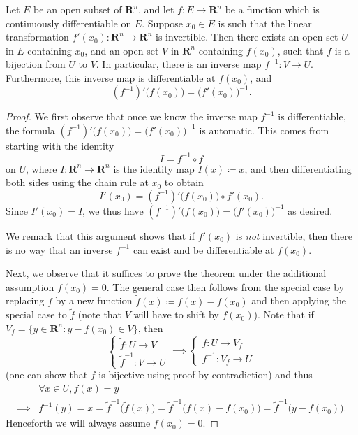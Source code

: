 \begin{theorem}\label{6.7.2}
    Let \(E\) be an open subset of \(\mathbf{R}^n\), and let \(f : E \to \mathbf{R}^n\) be a function which is continuously differentiable on \(E\).
    Suppose \(x_0 \in E\) is such that the linear transformation \(f'(x_0) : \mathbf{R}^n \to \mathbf{R}^n\) is invertible.
    Then there exists an open set \(U\) in \(E\) containing \(x_0\), and an open set \(V\) in \(\mathbf{R}^n\) containing \(f(x_0)\), such that \(f\) is a bijection from \(U\) to \(V\).
    In particular, there is an inverse map \(f^{-1} : V \to U\).
    Furthermore, this inverse map is differentiable at \(f(x_0)\), and
    \[
        (f^{-1})' \big(f(x_0)\big) = \big(f'(x_0)\big)^{-1}.
    \]
\end{theorem}

\begin{proof}
    We first observe that once we know the inverse map \(f^{-1}\) is differentiable, the formula \((f^{-1})' \big(f(x_0)\big) = \big(f'(x_0)\big)^{-1}\) is automatic.
    This comes from starting with the identity
    \[
        I = f^{-1} \circ f
    \]
    on \(U\), where \(I : \mathbf{R}^n \to \mathbf{R}^n\) is the identity map \(I(x) \coloneqq x\), and then differentiating both sides using the chain rule at \(x_0\) to obtain
    \[
        I'(x_0) = (f^{-1})' \big(f(x_0)\big) \circ f'(x_0).
    \]
    Since \(I'(x_0) = I\), we thus have \((f^{-1})' \big(f(x_0)\big) = \big(f'(x_0)\big)^{-1}\) as desired.

    We remark that this argument shows that if \(f'(x_0)\) is \emph{not} invertible, then there is no way that an inverse \(f^{-1}\) can exist and be differentiable at \(f(x_0)\).

    Next, we observe that it suffices to prove the theorem under the additional assumption \(f(x_0) = 0\).
    The general case then follows from the special case by replacing \(f\) by a new function \(\tilde{f}(x) \coloneqq f(x) - f(x_0)\) and then applying the special case to \(\tilde{f}\)
    (note that \(V\) will have to shift by \(f(x_0)\)).
    Note that if \(V_f = \{y \in \mathbf{R}^n : y - f(x_0) \in V\}\), then
    \[
        \begin{cases}
            \tilde{f} : U \to V \\
            \tilde{f}^{-1} : V \to U
        \end{cases} \implies \begin{cases}
            f : U \to V_f \\
            f^{-1} : V_f \to U
        \end{cases}
    \]
    (one can show that \(f\) is bijective using proof by contradiction)
    and thus
    \begin{align*}
                 & \forall x \in U, f(x) = y                                                                                                          \\
        \implies & f^{-1}(y) = x = \tilde{f}^{-1}\big(\tilde{f}(x)\big) = \tilde{f}^{-1}\big(f(x) - f(x_0)\big) = \tilde{f}^{-1}\big(y - f(x_0)\big).
    \end{align*}
    Henceforth we will always assume \(f(x_0) = 0\).


\end{proof}
